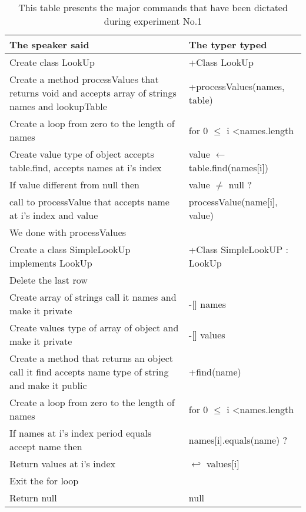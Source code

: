 \begin{table}[H]
	\begin{tabular}{|p{10cm}|p{6cm}|}
		\hline
		\rowcolor[HTML]{9B9B9B} 
		{\color[HTML]{000000} The speaker said} & {\color[HTML]{000000} The typer typed} \\ \hline
		Create class LookUp & +Class LookUp \\ \hline
		Create a method processValues that returns void and accepts array of strings names and lookupTable & +processValues(names, table) \\ \hline
		Create a loop from zero to the length of names & for 0 $\leq$ i \textless names.length \\ \hline
		Create value type of object accepts table.find, accepts names at i’s index & value $\leftarrow $ table.find(names{[}i{]}) \\ \hline
		If value different from null then & value $\neq$ null ? \\ \hline
		call to processValue that accepts name at i’s index and value & processValue(name{[}i{]}, value) \\ \hline
		We done with processValues &  \\ \hline
		Create a class SimpleLookUp implements LookUp & +Class SimpleLookUP : LookUp \\ \hline
		Delete the last row &  \\ \hline
		Create array of strings call it names and make it private & -{[}{]} names \\ \hline
		Create values type of array of object and make it private & -{[}{]} values \\ \hline
		Create a method that returns an object call it find accepts name type of string and make it public & +find(name) \\ \hline
		Create a loop from zero to the length of names & for 0 $\leq$ i \textless names.length \\ \hline
		If names at i’s index period equals accept name then & names{[}i{]}.equals(name) ? \\ \hline
		Return values at i’s index & $\hookleftarrow$ values{[}i{]} \\ \hline
		Exit the for loop &  \\ \hline
		Return null & null \\ \hline
	\end{tabular}
	\caption{This table presents the major commands that have been dictated during experiment No.1}
	\label{tab1}
\end{table}
